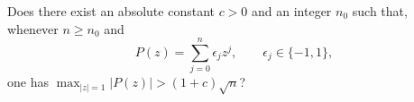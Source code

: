 Does there exist an absolute constant $c>0$ and an integer $n_0$ such that, whenever $n\geq n_0$ and
\[
P(z)=\sum_{j=0}^n\epsilon_jz^j,\qquad \epsilon_j\in\{-1,1\},
\]
one has $\max_{|z|=1}|P(z)|>(1+c)\sqrt n$?
